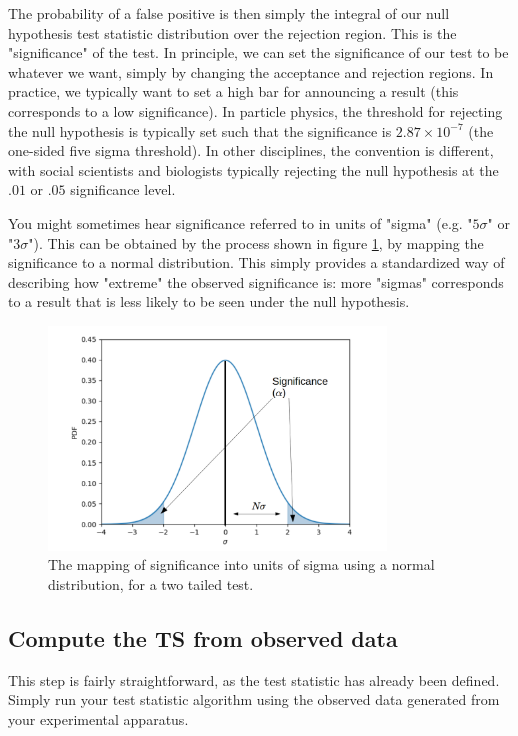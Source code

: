 The probability of a false positive is then simply the integral of our null hypothesis test statistic distribution over the rejection region. This is the "significance" of the test. In principle, we can set the significance of our test to be whatever we want, simply by changing the acceptance and rejection regions. In practice, we typically want to set a high bar for announcing a result (this corresponds to a low significance). In particle physics, the threshold for rejecting the null hypothesis is typically set such that the significance is $2.87 \times 10 ^{-7}$ (the one-sided five sigma threshold). In other disciplines, the convention is different, with social scientists and biologists typically rejecting the null hypothesis at the $.01$ or $.05$ significance level. 

You might sometimes hear significance referred to in units of "sigma" (e.g. "$5 \sigma$" or "$3 \sigma$"). This can be obtained by the process shown in figure \ref{fig:sigmamap}, by mapping the significance to a normal distribution. This simply provides a standardized way of describing how "extreme" the observed significance is: more "sigmas" corresponds to a result that is less likely to be seen under the null hypothesis. 

\begin{figure}[h]
\centering
\includegraphics[width=0.8\textwidth]{figs/sigmamap.png}
\caption{The mapping of significance into units of sigma using a normal distribution, for a two tailed test.}
\label{fig:sigmamap}
\end{figure}

\subsection{Compute the TS from observed data}
This step is fairly straightforward, as the test statistic has already been defined. Simply run your test statistic algorithm using the observed data generated from your experimental apparatus. 

